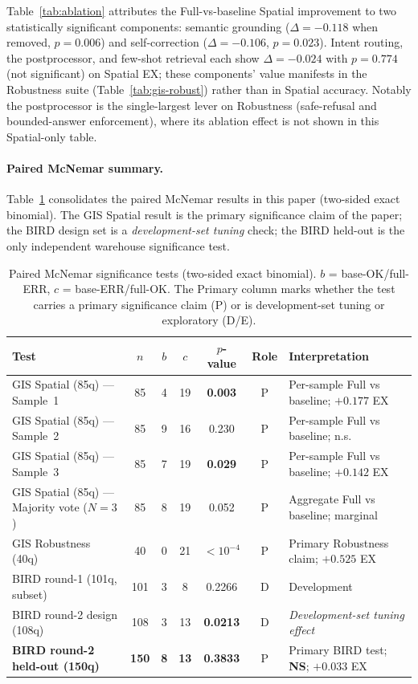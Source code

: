 \documentclass[11pt]{article}
\begin{document}
Table~\ref{tab:ablation} attributes the Full-vs-baseline Spatial improvement to two statistically significant components: semantic grounding ($\Delta = -0.118$ when removed, $p=0.006$) and self-correction ($\Delta = -0.106$, $p=0.023$). Intent routing, the postprocessor, and few-shot retrieval each show $\Delta = -0.024$ with $p=0.774$ (not significant) on Spatial EX; these components' value manifests in the Robustness suite (Table~\ref{tab:gis-robust}) rather than in Spatial accuracy. Notably the postprocessor is the single-largest lever on Robustness (safe-refusal and bounded-answer enforcement), where its ablation effect is not shown in this Spatial-only table.

\paragraph{Paired McNemar summary.}
Table~\ref{tab:mcnemar} consolidates the paired McNemar results in this paper (two-sided exact binomial). The GIS Spatial result is the primary significance claim of the paper; the BIRD design set is a \emph{development-set tuning} check; the BIRD held-out is the only independent warehouse significance test.

\begin{table}[t]
\centering
\footnotesize
\caption{Paired McNemar significance tests (two-sided exact binomial). $b$ = base-OK/full-ERR, $c$ = base-ERR/full-OK. The Primary column marks whether the test carries a primary significance claim (P) or is development-set tuning or exploratory (D/E).}
\label{tab:mcnemar}
\begin{tabular}{lcccccp{3.5cm}}
\toprule
Test & $n$ & $b$ & $c$ & $p$-value & Role & Interpretation \\
\midrule
GIS Spatial (85q) --- Sample~1     & 85  & 4  & 19 & \textbf{0.003} & P & Per-sample Full vs baseline; $+0.177$ EX \\
GIS Spatial (85q) --- Sample~2     & 85  & 9  & 16 & 0.230 & P & Per-sample Full vs baseline; n.s. \\
GIS Spatial (85q) --- Sample~3     & 85  & 7  & 19 & \textbf{0.029} & P & Per-sample Full vs baseline; $+0.142$ EX \\
GIS Spatial (85q) --- Majority vote ($N{=}3$) & 85 & 8 & 19 & 0.052 & P & Aggregate Full vs baseline; marginal \\
GIS Robustness (40q)               & 40  & 0  & 21 & \textbf{$<10^{-4}$} & P & Primary Robustness claim; $+0.525$ EX \\
BIRD round-1 (101q, subset)        & 101 & 3  & 8  & 0.2266 & D & Development \\
BIRD round-2 design (108q)         & 108 & 3  & 13 & \textbf{0.0213} & D & \emph{Development-set tuning effect} \\
\textbf{BIRD round-2 held-out (150q)} & \textbf{150} & \textbf{8} & \textbf{13} & \textbf{0.3833} & P & Primary BIRD test; \textbf{NS}; $+0.033$ EX \\
\bottomrule
\end{tabular}
\end{table}
\end{document}
